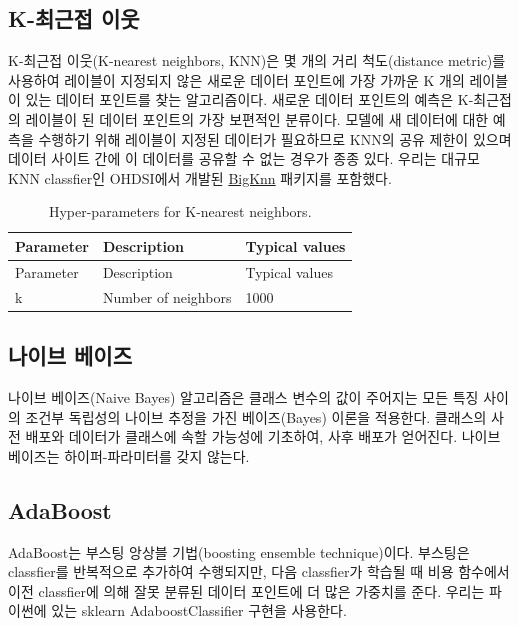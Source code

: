 \documentclass[10.5pt]{book}
\theoremstyle{definition}
\theoremstyle{definition}
\theoremstyle{definition}
\theoremstyle{remark}
\begin{document}
\subsection{K-최근접 이웃}\label{k--}

K-최근접 이웃(K-nearest neighbors, KNN)은 몇 개의 거리 척도(distance
metric)를 사용하여 레이블이 지정되지 않은 새로운 데이터 포인트에 가장
가까운 K 개의 레이블이 있는 데이터 포인트를 찾는 알고리즘이다. 새로운
데이터 포인트의 예측은 K-최근접의 레이블이 된 데이터 포인트의 가장
보편적인 분류이다. 모델에 새 데이터에 대한 예측을 수행하기 위해 레이블이
지정된 데이터가 필요하므로 KNN의 공유 제한이 있으며 데이터 사이트 간에
이 데이터를 공유할 수 없는 경우가 종종 있다. 우리는 대규모 KNN
classfier인 OHDSI에서 개발된
\href{https://github.com/OHDSI/BigKnn}{BigKnn} 패키지를 포함했다.
 

\begin{longtable}[]{@{}lll@{}}
\caption{\label{tab:knnParameters} Hyper-parameters for K-nearest
neighbors.}\tabularnewline
\toprule
Parameter & Description & Typical values\tabularnewline
\midrule
\endfirsthead
\toprule
Parameter & Description & Typical values\tabularnewline
\midrule
\endhead
k & Number of neighbors & 1000\tabularnewline
\bottomrule
\end{longtable}

\subsection{나이브 베이즈}\label{-}

나이브 베이즈(Naive Bayes) 알고리즘은 클래스 변수의 값이 주어지는 모든
특징 사이의 조건부 독립성의 나이브 추정을 가진 베이즈(Bayes) 이론을
적용한다. 클래스의 사전 배포와 데이터가 클래스에 속할 가능성에 기초하여,
사후 배포가 얻어진다. 나이브 베이즈는 하이퍼-파라미터를 갖지 않는다.

\subsection{AdaBoost}\label{adaboost}

AdaBoost는 부스팅 앙상블 기법(boosting ensemble technique)이다. 부스팅은
classfier를 반복적으로 추가하여 수행되지만, 다음 classfier가 학습될 때
비용 함수에서 이전 classfier에 의해 잘못 분류된 데이터 포인트에 더 많은
가중치를 준다. 우리는 파이썬에 있는 sklearn AdaboostClassifier 구현을
사용한다.  
\end{document}
